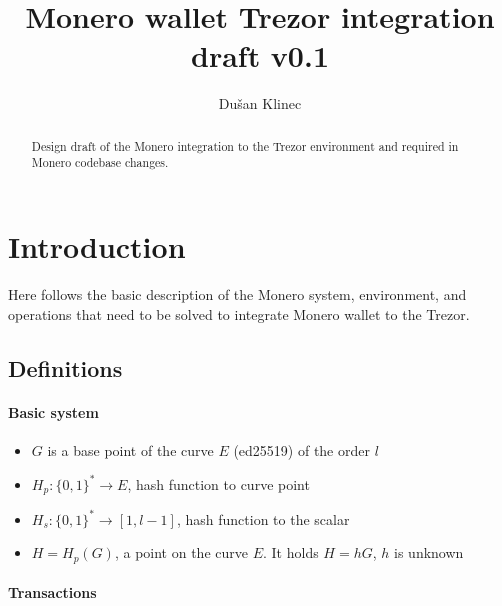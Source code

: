 \documentclass[]{article}
\title{Monero wallet Trezor integration draft v0.1}
\author{Du\v{s}an Klinec}
\begin{document}
	
\maketitle

\begin{abstract}
	Design draft of the Monero integration to the Trezor environment and required in Monero codebase changes.
\end{abstract}

\section{Introduction}
Here follows the basic description of the Monero system, environment, and operations that need to be solved to integrate Monero wallet to the Trezor.

\subsection{Definitions}

\paragraph{Basic system}

\begin{itemize}
	\item $G$ is a base point of the curve $E$ (ed25519) of the order $l$
	\item $H_p : \{0,1\}^* \rightarrow E$, hash function to curve point
	\item $H_s : \{0,1\}^* \rightarrow [1, l-1]$, hash function to the scalar
	\item $H = H_p(G)$, a point on the curve $E$. It holds $H=hG$, $h$ is unknown
	
\end{itemize}

\paragraph{Transactions}
\end{document}
